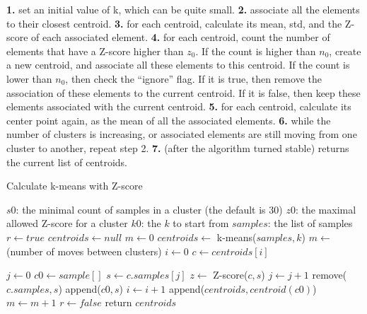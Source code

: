 \documentclass[12pt]{article}
\begin{document}
\textbf{1.} set an initial value of k, which can be quite small. \newline
\textbf{2.} associate all the elements to their closest centroid. \newline
\textbf{3.} for each centroid, calculate its mean, std, and the Z-score of each associated element. \newline
\textbf{4.} for each centroid, count the number of elements that have a Z-score higher than $z_0$. If the count is higher than $n_0$, create a new centroid, and associate all these elements to this centroid.
If the count is lower than $n_0$, then check the “ignore” flag. If it is true, then remove the association of these elements to the current centroid. If it is false, then keep these elements associated with the current centroid. \newline
\textbf{5.} for each centroid, calculate its center point again, as the mean of all the associated elements. \newline
\textbf{6.} while the number of clusters is increasing, or associated elements are still moving from one cluster to another, repeat step 2. \newline
\textbf{7.} (after the algorithm turned stable) returns the current list of centroids. \newline
\newpage
\begin{algorithm}
\caption{Calculate k-means with Z-score}
\begin{algorithmic} 
\REQUIRE
\STATE $s0$: the minimal count of samples in a cluster (the default is 30)
\STATE $z0$: the maximal allowed Z-score for a cluster
\STATE $k0$: the $k$ to start from
\STATE $samples$: the list of samples
\ENSURE
\STATE $r \leftarrow true$
\newline
\STATE $centroids \leftarrow null$
\STATE $m \leftarrow 0$
\STATE $centroids \leftarrow $ k-means($samples, k$)
\STATE $m \leftarrow $ (number of moves between clusters)
\newline
\STATE $i \leftarrow 0$
\STATE $c \leftarrow centroids[i]$

\STATE $j \leftarrow 0$
\STATE $c0 \leftarrow sample[]$
\STATE $s \leftarrow c.samples[j]$
\STATE $z \leftarrow $ Z-score($c,s$)
\STATE $j \leftarrow j+1$
\STATE remove($c.samples,s$)
\STATE append($c0,s$)
\ENDIF
\STATE $i \leftarrow i+1$
\ENDWHILE
{}
\STATE append($centroids,centroid(c0)$)
\newline
\STATE $m \leftarrow m+1$
\ENDIF
\ENDWHILE
{}
\STATE $r \leftarrow false$
\ENDIF
\ENDWHILE
\STATE return $centroids$
\end{algorithmic}
\end{algorithm}
\end{document}
